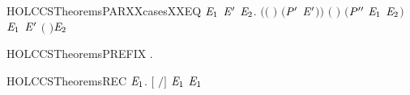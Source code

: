 \begin{SaveVerbatim}{HOLCCSTheoremsPARXXcasesXXEQ}
       \HOLSymConst{\HOLTokenExists{}}  \ensuremath{\HOLBoundVar{E}\sb{\mathrm{1}}} \ensuremath{\HOLBoundVar{E}\sp{\prime}} \ensuremath{\HOLBoundVar{E}\sb{\mathrm{2}}}.
           \ensuremath{(}\ensuremath{(} \HOLSymConst{\ensuremath{=}} \ensuremath{)} \HOLSymConst{\HOLTokenConj{}} \ensuremath{(}\ensuremath{\HOLBoundVar{P}\sp{\prime}} \HOLSymConst{\ensuremath{=}} \ensuremath{\HOLBoundVar{E}\sp{\prime}}\ensuremath{)}\ensuremath{)} \HOLSymConst{\HOLTokenConj{}} \ensuremath{(} \HOLSymConst{\ensuremath{=}} \HOLConst{\ensuremath{\tau}}\ensuremath{)} \HOLSymConst{\HOLTokenConj{}} \ensuremath{(}\ensuremath{\HOLBoundVar{P}\sp{\prime\prime}} \HOLSymConst{\ensuremath{=}} \ensuremath{\HOLBoundVar{E}\sb{\mathrm{1}}} \HOLSymConst{\ensuremath{\mid}} \ensuremath{\HOLBoundVar{E}\sb{\mathrm{2}}}\ensuremath{)} \HOLSymConst{\HOLTokenConj{}}
            \HOLTokenTransBegin{} \HOLTokenTransEnd \ensuremath{\HOLBoundVar{E}\sb{\mathrm{1}}} \HOLSymConst{\HOLTokenConj{}} \ensuremath{\HOLBoundVar{E}\sp{\prime}} \HOLTokenTransBegin{} \ensuremath{(} \ensuremath{)}\HOLTokenTransEnd \ensuremath{\HOLBoundVar{E}\sb{\mathrm{2}}}
\end{SaveVerbatim}
\newcommand{\HOLCCSTheoremsPARXXcasesXXEQ}{\UseVerbatim{HOLCCSTheoremsPARXXcasesXXEQ}}
\begin{SaveVerbatim}{HOLCCSTheoremsPREFIX}
\HOLTokenTurnstile{} \HOLSymConst{\HOLTokenForall{}} . \HOLSymConst{\ensuremath{\ldotp}} \HOLTokenTransBegin{}\HOLTokenTransEnd {}
\end{SaveVerbatim}
\newcommand{\HOLCCSTheoremsPREFIX}{\UseVerbatim{HOLCCSTheoremsPREFIX}}
\begin{SaveVerbatim}{HOLCCSTheoremsREC}
\HOLTokenTurnstile{} \HOLSymConst{\HOLTokenForall{}}   \ensuremath{\HOLBoundVar{E}\sb{\mathrm{1}}}. \ensuremath{[}  \ensuremath{/}\ensuremath{]}  \HOLTokenTransBegin{}\HOLTokenTransEnd \ensuremath{\HOLBoundVar{E}\sb{\mathrm{1}}} \HOLSymConst{\HOLTokenImp{}}    \HOLTokenTransBegin{}\HOLTokenTransEnd \ensuremath{\HOLBoundVar{E}\sb{\mathrm{1}}}
\end{SaveVerbatim}
\newcommand{\HOLCCSTheoremsREC}{\UseVerbatim{HOLCCSTheoremsREC}}
